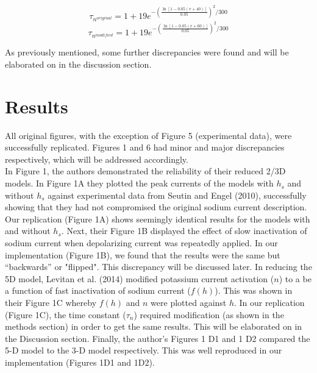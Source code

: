 \begin{center}
	$$\tau_{n^{original}} = 1 + 19 e^{- (\frac{{\ln[1 - 0.05 (v+40)]}}{0.05})^{2}/300}$$
	$$\tau_{n^{modified}} = 1 + 19 e^{- (\frac{{\ln[1 - 0.05 (v+60)]}}{0.05})^{2}/300}$$
\end{center}

As previously mentioned, some further discrepancies were found and will be elaborated on in the discussion section. 


\section{Results}

All original figures, with the exception of Figure 5 (experimental data), were successfully replicated. Figures 1 and 6 had minor and major discrepancies respectively, which will be addressed accordingly.\\  
In Figure 1, the authors demonstrated the reliability of their reduced 2/3D models. In Figure 1A they plotted the peak currents of the models with $h_{s}$ and without $h_{s}$ against experimental data from Seutin and Engel (2010), successfully showing that they had not compromised the original sodium current description.  Our replication (Figure 1A) shows seemingly identical results for the models with and without $h_{s}$. Next, their Figure 1B displayed the effect of slow inactivation of sodium current when depolarizing current was repeatedly applied. In our implementation (Figure 1B), we found that the results were the same but “backwards” or "flipped". This discrepancy will be discussed later. In reducing the 5D model, Levitan et al. (2014) modified potassium current activation ($n$) to a be a function of fast inactivation of sodium current ($f(h)$). This was shown in their Figure 1C whereby $f(h)$ and $n$ were plotted against $h$. In our replication (Figure 1C), the time constant ($\tau_n$) required modification (as shown in the methods section) in order to get the same results. This will be elaborated on in the Discussion section. Finally, the author's Figures 1 D1 and 1 D2 compared the 5-D model to the 3-D model respectively. This was well reproduced in our implementation (Figures 1D1 and 1D2).\\ 

